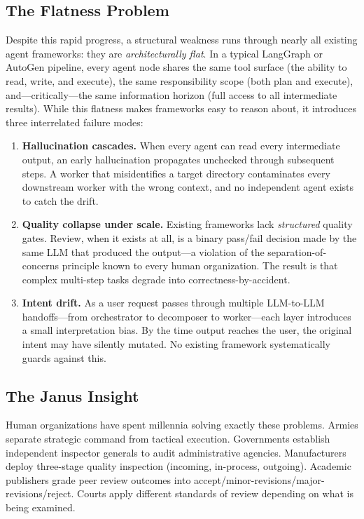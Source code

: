 \documentclass[11pt,a4paper]{article}
\begin{document}
\subsection{The Flatness Problem}

Despite this rapid progress, a structural weakness runs through nearly all
existing agent frameworks: they are \emph{architecturally flat}.
In a typical LangGraph or AutoGen pipeline, every agent node shares the same
tool surface (the ability to read, write, and execute), the same
responsibility scope (both plan and execute), and---critically---the same
information horizon (full access to all intermediate results).
While this flatness makes frameworks easy to reason about, it introduces
three interrelated failure modes:

\begin{enumerate}[leftmargin=*,itemsep=2pt]
    \item \textbf{Hallucination cascades.}
    When every agent can read every intermediate output, an early hallucination
    propagates unchecked through subsequent steps. A worker that misidentifies
    a target directory contaminates every downstream worker with the wrong
    context, and no independent agent exists to catch the drift.

    \item \textbf{Quality collapse under scale.}
    Existing frameworks lack \emph{structured} quality gates. Review, when it
    exists at all, is a binary pass/fail decision made by the same LLM that
    produced the output---a violation of the separation-of-concerns principle
    known to every human organization. The result is that complex multi-step
    tasks degrade into correctness-by-accident.

    \item \textbf{Intent drift.}
    As a user request passes through multiple LLM-to-LLM handoffs---from
    orchestrator to decomposer to worker---each layer introduces a small
    interpretation bias. By the time output reaches the user, the original
    intent may have silently mutated. No existing framework systematically
    guards against this.
\end{enumerate}

\subsection{The Janus Insight}

Human organizations have spent millennia solving exactly these problems.
Armies separate strategic command from tactical execution.
Governments establish independent inspector generals to audit administrative
agencies. Manufacturers deploy three-stage quality inspection (incoming,
in-process, outgoing). Academic publishers grade peer review outcomes into
accept/minor-revisions/major-revisions/reject.
Courts apply different standards of review depending on what is being examined.
\end{document}

